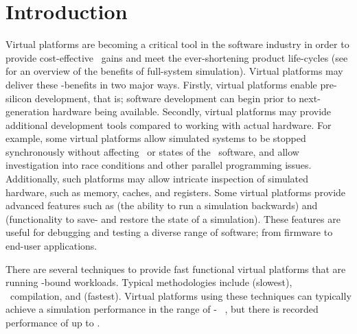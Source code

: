 
\chapter{Introduction}
\label{cha:introduction}
Virtual platforms are becoming a critical tool in the software industry in order to provide cost-effective \dvttermttm\ gains and meet the ever-shortening product life-cycles (see  for an overview of the benefits of full-system simulation).
Virtual platforms may deliver these \dvttermttm -benefits in two major ways.
Firstly, virtual platforms enable pre-silicon development, that is; software development can begin prior to next-generation hardware being available.
Secondly, virtual platforms may provide additional development tools compared to working with actual hardware.
For example, some virtual platforms allow simulated systems to be stopped synchronously without affecting \dvttermtiming\ or states of the \dvttermtarget\ software, and allow investigation into race conditions and other parallel programming issues.
Additionally, such platforms may allow intricate inspection of simulated hardware, such as memory, caches, and registers.
Some virtual platforms provide advanced features such as \dvttermreverseexecution {} (the ability to run a simulation backwards) and \dvttermcheckpointing {} (functionality to save- and restore the state of a simulation).
These features are useful for debugging and testing a diverse range of software; from firmware to end-user applications.

There are several techniques to provide fast functional virtual platforms that are running \dvttermcpu -bound workloads. Typical methodologies include \dvtterminterpretation {} (slowest), \dvttermjit\ compilation, and \dvttermdirectvirtualization {} (fastest).
Virtual platforms using these techniques can typically achieve a simulation performance in the range of - \dvttermmipsecond\ , but there is recorded performance of up to  \dvttermmipsecond {}.\\

